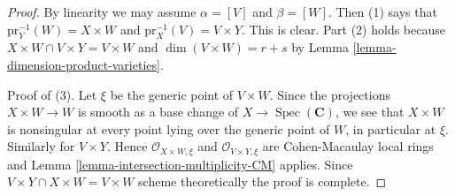\documentclass[10pt,a4paper]{amsart}
\theoremstyle{plain}
\theoremstyle{definition}
\theoremstyle{remark}
\numberwithin{equation}{subsection}
\def\Spec{\mathop{\mathrm{Spec}}}
\begin{document}
\begin{proof}
By linearity we may assume $\alpha = [V]$ and $\beta = [W]$.
Then (1) says that $\text{pr}_Y^{-1}(W) = X \times W$ and
$\text{pr}_X^{-1}(V) = V \times Y$. This is clear.
Part (2) holds because $X \times W \cap V \times Y = V \times W$ and
$\dim(V \times W) = r + s$ by Lemma \ref{lemma-dimension-product-varieties}.

\medskip\noindent
Proof of (3).
Let $\xi$ be the generic point of $V \times W$.
Since the projections $X \times W \to W$ is smooth as a base change of
$X \to \Spec(\mathbf{C})$, we see that $X \times W$ is nonsingular
at every point lying over the generic point of $W$, in particular at $\xi$.
Similarly for $V \times Y$. Hence $\mathcal{O}_{X \times W, \xi}$
and $\mathcal{O}_{V \times Y, \xi}$ are Cohen-Macaulay local rings
and Lemma \ref{lemma-intersection-multiplicity-CM} applies.
Since $V \times Y \cap X \times W = V \times W$ scheme theoretically
the proof is complete.
\end{proof}
\end{document}
